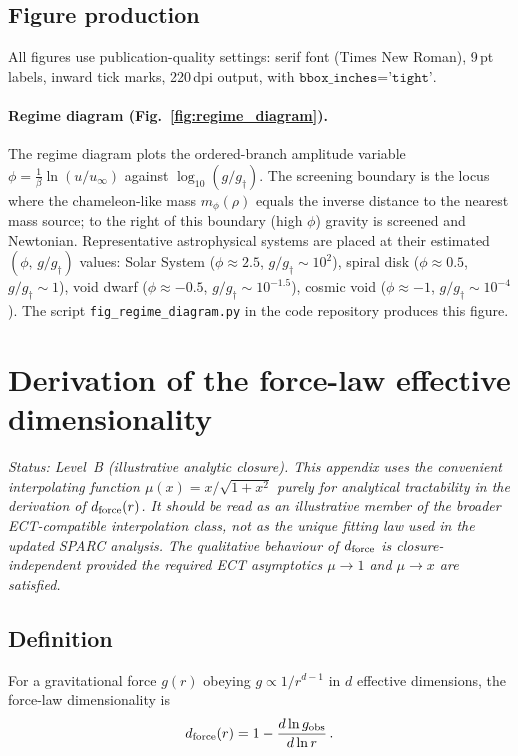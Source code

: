 \documentclass[11pt,a4paper]{article}
\numberwithin{equation}{section}
\begin{document}
\subsection{Figure production}

All figures use publication-quality settings: serif font (Times New
Roman), 9\,pt labels, inward tick marks, 220\,dpi output, with
$\texttt{bbox\_inches='tight'}$.

\paragraph{Regime diagram (Fig.~\ref{fig:regime_diagram}).}
The regime diagram plots the ordered-branch amplitude variable
$\phi = \frac{1}{\beta}\ln(u/u_\infty)$ against
$\log_{10}(g/g_\dagger)$.
The screening boundary is the locus where the chameleon-like
mass $m_\phi(\rho)$ equals the inverse distance to the
nearest mass source; to the right of this boundary (high $\phi$)
gravity is screened and Newtonian.
Representative astrophysical systems are placed at their
estimated $(\phi,\,g/g_\dagger)$ values:
Solar System ($\phi \approx 2.5$, $g/g_\dagger \sim 10^2$),
spiral disk ($\phi \approx 0.5$, $g/g_\dagger \sim 1$),
void dwarf ($\phi \approx -0.5$, $g/g_\dagger \sim 10^{-1.5}$),
cosmic void ($\phi \approx -1$, $g/g_\dagger \sim 10^{-4}$).
The script \texttt{fig\_regime\_diagram.py} in the code
repository produces this figure.

\section{Derivation of the force-law effective dimensionality}
\label{app:deff_method}

\textit{Status: Level~B (illustrative analytic closure).
This appendix uses the convenient interpolating function
$\mu(x)=x/\sqrt{1+x^2}$ purely for analytical tractability in the
derivation of $d_{\rm force}(r)$.  It should be read as an
illustrative member of the broader ECT-compatible interpolation class,
not as the unique fitting law used in the updated SPARC analysis.
The qualitative behaviour of $d_{\rm force}$ is closure-independent
provided the required ECT asymptotics $\mu\to1$ and $\mu\to x$ are
satisfied.}

\subsection{Definition}

For a gravitational force $g(r)$ obeying
$g \propto 1/r^{d-1}$ in $d$ effective dimensions,
the force-law dimensionality is
\begin{equation}
d_{\rm force}(r) = 1 - \frac{d\ln g_{\rm obs}}{d\ln r}\,.
\label{eq:app_dforce_def}
\end{equation}
\end{document}
